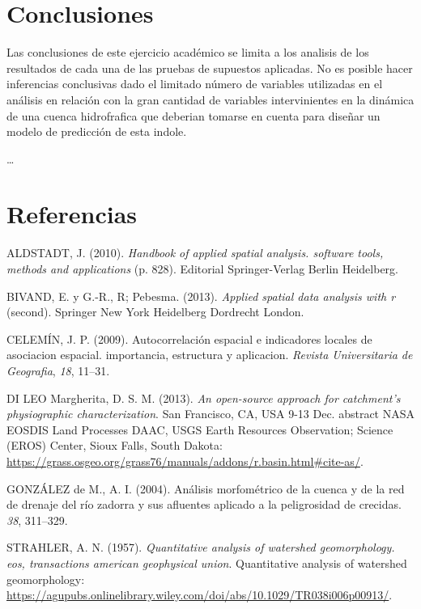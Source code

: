 \documentclass[11pt,]{article}
\begin{document}
\section{Conclusiones}\label{conclusiones}

Las conclusiones de este ejercicio académico se limita a los analisis de
los resultados de cada una de las pruebas de supuestos aplicadas. No es
posible hacer inferencias conclusivas dado el limitado número de
variables utilizadas en el análisis en relación con la gran cantidad de
variables intervinientes en la dinámica de una cuenca hidrofrafica que
deberian tomarse en cuenta para diseñar un modelo de predicción de esta
indole.

\ldots

\section*{Referencias}\label{referencias}

\hypertarget{refs}{}
\hypertarget{ref-SpatialClustering}{}
ALDSTADT, J. (2010). \emph{Handbook of applied spatial analysis.
software tools, methods and applications} (p. 828). Editorial
Springer-Verlag Berlin Heidelberg.

\hypertarget{ref-AppliedSpatialDataAnalysis}{}
BIVAND, E. y G.-R., R; Pebesma. (2013). \emph{Applied spatial data
analysis with r} (second). Springer New York Heidelberg Dordrecht
London.

\hypertarget{ref-Autocorrelacionespacial}{}
CELEMÍN, J. P. (2009). Autocorrelación espacial e indicadores locales de
asociacion espacial. importancia, estructura y aplicacion. \emph{Revista
Universitaria de Geografia}, \emph{18}, 11--31.

\hypertarget{ref-physiograficCharacterization}{}
DI LEO Margherita, D. S. M. (2013). \emph{An open-source approach for
catchment's physiographic characterization}. San Francisco, CA, USA 9-13
Dec. abstract NASA EOSDIS Land Processes DAAC, USGS Earth Resources
Observation; Science (EROS) Center, Sioux Falls, South Dakota:
\url{https://grass.osgeo.org/grass76/manuals/addons/r.basin.html\#cite-as/}.

\hypertarget{ref-AnalisisMorfometrico}{}
GONZÁLEZ de M., A. I. (2004). Análisis morfométrico de la cuenca y de la
red de drenaje del río zadorra y sus afluentes aplicado a la
peligrosidad de crecidas. \emph{38}, 311--329.

\hypertarget{ref-Quantitativeanalysis}{}
STRAHLER, A. N. (1957). \emph{Quantitative analysis of watershed
geomorphology. eos, transactions american geophysical union}.
Quantitative analysis of watershed geomorphology:
\url{https://agupubs.onlinelibrary.wiley.com/doi/abs/10.1029/TR038i006p00913/}.




\newpage
\singlespacing 
\end{document}
